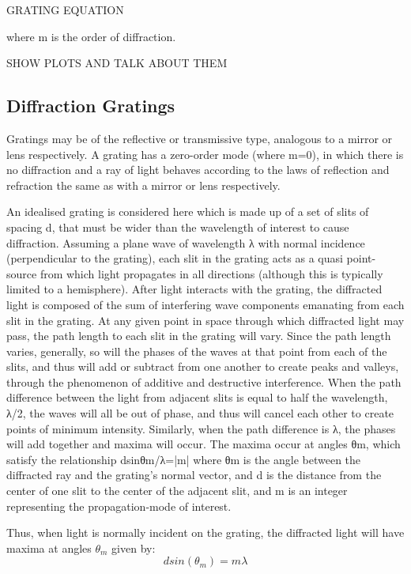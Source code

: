 GRATING EQUATION

where m is the order of diffraction. 

SHOW PLOTS AND TALK ABOUT THEM


\subsection{Diffraction Gratings}
Gratings may be of the reflective or transmissive type, analogous to a mirror or lens respectively. A grating has a zero-order mode (where m=0), in which there is no diffraction and a ray of light behaves according to the laws of reflection and refraction the same as with a mirror or lens respectively.

An idealised grating is considered here which is made up of a set of slits of spacing d, that must be wider than the wavelength of interest to cause diffraction. Assuming a plane wave of wavelength λ with normal incidence (perpendicular to the grating), each slit in the grating acts as a quasi point-source from which light propagates in all directions (although this is typically limited to a hemisphere). After light interacts with the grating, the diffracted light is composed of the sum of interfering wave components emanating from each slit in the grating. At any given point in space through which diffracted light may pass, the path length to each slit in the grating will vary. Since the path length varies, generally, so will the phases of the waves at that point from each of the slits, and thus will add or subtract from one another to create peaks and valleys, through the phenomenon of additive and destructive interference. When the path difference between the light from adjacent slits is equal to half the wavelength, λ/2, the waves will all be out of phase, and thus will cancel each other to create points of minimum intensity. Similarly, when the path difference is λ, the phases will add together and maxima will occur. The maxima occur at angles θm, which satisfy the relationship dsinθm/λ=|m| where θm is the angle between the diffracted ray and the grating's normal vector, and d is the distance from the center of one slit to the center of the adjacent slit, and m is an integer representing the propagation-mode of interest.


Thus, when light is normally incident on the grating, the diffracted light will have maxima at angles $\theta_m$ given by:
\begin{equation*}
d sin(\theta_m) = m\lambda
\end{equation*}

